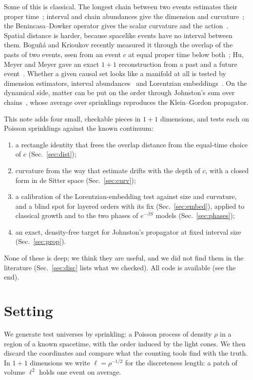 \documentclass[11pt,a4paper]{article}
\begin{document}
Some of this is classical. The longest chain between two events estimates their proper time~\cite{BrightwellGregory91}; interval and chain abundances give the dimension and curvature~\cite{RSS13,GlaserSurya13}; the Benincasa--Dowker operator gives the scalar curvature and the action~\cite{BD10,DowkerGlaser13}. Spatial distance is harder, because spacelike events have no interval between them. Bogu\~n\'a and Krioukov recently measured it through the overlap of the pasts of two events, seen from an event $c$ at equal proper time below both~\cite{BK24}; Hu, Meyer and Meyer gave an exact $1+1$ reconstruction from a past and a future event~\cite{HMM25}. Whether a given causal set looks like a manifold at all is tested by dimension estimators, interval abundances~\cite{GlaserSurya13} and Lorentzian embeddings~\cite{CloughEvans16,Henson06,Johnston25}. On the dynamical side, matter can be put on the order through Johnston's sum over chains~\cite{Johnston08,Johnston09}, whose average over sprinklings reproduces the Klein--Gordon propagator.

This note adds four small, checkable pieces in $1+1$ dimensions, and tests each on Poisson sprinklings against the known continuum:
\begin{enumerate}[leftmargin=*,itemsep=1pt]
\item a rectangle identity that frees the overlap distance from the equal-time choice of $c$ (Sec.~\ref{sec:dist});
\item curvature from the way that estimate drifts with the depth of $c$, with a closed form in de Sitter space (Sec.~\ref{sec:curv});
\item a calibration of the Lorentzian-embedding test against size and curvature, and a blind spot for layered orders with its fix (Sec.~\ref{sec:embed}), applied to classical growth and to the two phases of $e^{-\beta S}$ models (Sec.~\ref{sec:phases});
\item an exact, density-free target for Johnston's propagator at fixed interval size (Sec.~\ref{sec:prop}).
\end{enumerate}
None of these is deep; we think they are useful, and we did not find them in the literature (Sec.~\ref{sec:disc} lists what we checked). All code is available (see the end).

\section{Setting}\label{sec:setting}
We generate test universes by sprinkling: a Poisson process of density $\rho$ in a region of a known spacetime, with the order induced by the light cones. We then discard the coordinates and compare what the counting tools find with the truth. In $1+1$ dimensions we write $\ell=\rho^{-1/2}$ for the discreteness length: a patch of volume $\ell^2$ holds one event on average.
\end{document}
